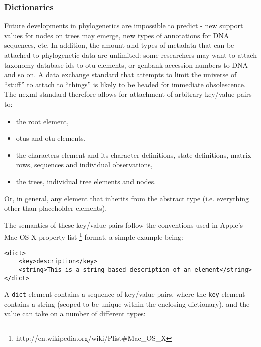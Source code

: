 \documentclass{article}
\newcommand{\code}{\texttt} \usepackage{fullpage}
\begin{document}
\subsubsection{Dictionaries} 

Future developments in phylogenetics are impossible to predict - new
support values for nodes on trees may emerge, new types of annotations
for DNA sequences, etc. In addition, the amount and types of metadata
that can be attached to phylogenetic data are unlimited: some
researchers may want to attach taxonomy database ids to otu elements, or
genbank accession numbers to DNA and so on. A data exchange standard
that attempts to limit the universe of ``stuff'' to attach to ``things''
is likely to be headed for immediate obsolescence. The nexml standard
therefore allows for attachment of arbitrary key/value pairs to:

\begin{itemize}

\item the root element,

\item otus and otu elements,

\item the characters element and its character definitions, state
definitions, matrix rows, sequences and individual observations,

\item the trees, individual tree elements and nodes.

\end{itemize}

Or, in general, any element that inherits from the
abstract type (i.e. everything other than placeholder elements).

The semantics of these key/value pairs follow the conventions used in
Apple's Mac OS X property list
\footnote{http://en.wikipedia.org/wiki/Plist\#Mac\_OS\_X} format, a
simple example being: 
\begin{verbatim} 
<dict> 
    <key>description</key>
    <string>This is a string based description of an element</string>
</dict> 
\end{verbatim} 
A \code{dict} element contains a sequence of
key/value pairs, where the \code{key} element contains a string (scoped
to be unique within the enclosing dictionary), and the value can take on
a number of different types:
\end{document}
